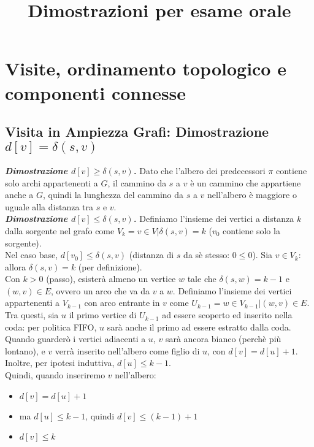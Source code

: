 \documentclass[11pt]{article}
\title{Dimostrazioni per esame orale}
\begin{document}
\section*{Visite, ordinamento topologico e componenti connesse}
\subsection*{Visita in Ampiezza Grafi: Dimostrazione $d[v] = \delta(s,v)$}
\textit{\textbf{Dimostrazione $d[v] \geq \delta(s,v)$.}} Dato che l'albero dei predecessori $\pi$ contiene solo archi appartenenti 
a $G$, il cammino da $s$ a $v$ è un cammino che appartiene anche a $G$, quindi la lunghezza del cammino da $s$ a $v$ 
nell'albero è maggiore o uguale alla distanza tra $s$ e $v$.\\
\textit{\textbf{Dimostrazione $d[v] \leq \delta(s,v)$.}} Definiamo l'insieme dei vertici a distanza $k$ dalla sorgente nel grafo 
come $V_k={v\in V|\delta(s,v)=k}$ ($v_0$ contiene solo la sorgente).\\ Nel caso base, $d[v_0]\leq \delta(s,v)$ (distanza di 
$s$ da sè stesso: $0\leq 0$). Sia $v\in V_k$: allora $\delta(s,v)=k$ (per definizione).\\ Con $k>0$ (passo), esisterà almeno 
un vertice $w$ tale che $\delta(s,w)=k-1$ e $(w,v)\in E$, ovvero un arco che va da $v$ a $w$. Definiamo l'insieme dei vertici 
appartenenti a $V_{k-1}$ con arco entrante in $v$ come $U_{k-1}={w\in V_{k-1}|(w,v)\in E}$. Tra questi, sia $u$ il primo 
vertice di $U_{k-1}$ ad essere scoperto ed inserito nella coda: per politica FIFO, $u$ sarà anche il primo ad essere estratto
dalla coda. Quando guarderò i vertici adiacenti a $u$, $v$ sarà ancora bianco (perchè più lontano), e $v$ verrà inserito 
nell'albero come figlio di $u$, con $d[v]=d[u]+1$. Inoltre, per ipotesi induttiva, $d[u]\leq k-1$.\\
Quindi, quando inseriremo $v$ nell'albero:
\begin{itemize}
    \item $d[v]=d[u]+1$
    \item ma $d[u]\leq k-1$, quindi $d[v]\leq (k-1)+1$
    \item $d[v]\leq k$
\end{itemize}
\end{document}
